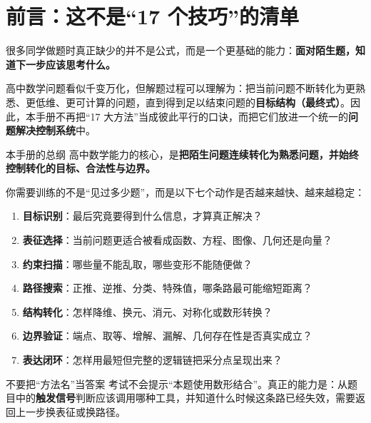 \documentclass[11pt,a4paper]{ctexart}
\begin{document}
\tableofcontents
\newpage

\section*{前言：这不是“17 个技巧”的清单}

很多同学做题时真正缺少的并不是公式，而是一个更基础的能力：\textbf{面对陌生题，知道下一步应该思考什么。}

高中数学问题看似千变万化，但解题过程可以理解为：把当前问题不断转化为更熟悉、更低维、更可计算的问题，直到得到足以结束问题的\textbf{目标结构（最终式）}。因此，本手册不再把“17 大方法”当成彼此平行的口诀，而把它们放进一个统一的\textbf{问题解决控制系统}中。

\begin{keybox}{本手册的总纲}
高中数学能力的核心，是\textbf{把陌生问题连续转化为熟悉问题，并始终控制转化的目标、合法性与边界。}
\end{keybox}

你需要训练的不是“见过多少题”，而是以下七个动作是否越来越快、越来越稳定：
\begin{enumerate}
  \item \textbf{目标识别}：最后究竟要得到什么信息，才算真正解决？
  \item \textbf{表征选择}：当前问题更适合被看成函数、方程、图像、几何还是向量？
  \item \textbf{约束扫描}：哪些量不能乱取，哪些变形不能随便做？
  \item \textbf{路径搜索}：正推、逆推、分类、特殊值，哪条路最可能缩短距离？
  \item \textbf{结构转化}：怎样降维、换元、消元、对称化或数形转换？
  \item \textbf{边界验证}：端点、取等、增解、漏解、几何存在性是否真实成立？
  \item \textbf{表达闭环}：怎样用最短但完整的逻辑链把采分点呈现出来？
\end{enumerate}

\begin{warningbox}{不要把“方法名”当答案}
考试不会提示“本题使用数形结合”。真正的能力是：从题目中的\textbf{触发信号}判断应该调用哪种工具，并知道什么时候这条路已经失效，需要返回上一步换表征或换路径。
\end{warningbox}

\newpage

\end{document}
